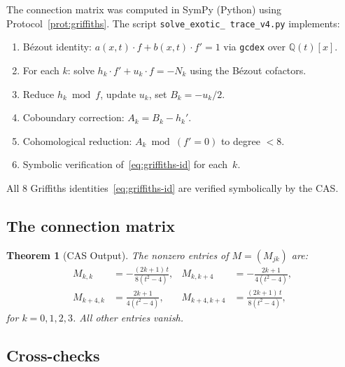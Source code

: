 \documentclass[11pt]{article}
\theoremstyle{plain}
\newtheorem{theorem}{Theorem}[section]
\theoremstyle{definition}
\theoremstyle{remark}
\newcommand{\Q}{\mathbb{Q}}
\begin{document}
The connection matrix was computed in SymPy (Python) using
Protocol~\ref{prot:griffiths}. The script \texttt{solve\_exotic\_%
trace\_v4.py} implements:
\begin{enumerate}[nosep]
\item B\'ezout identity: $a(x,t) \cdot f + b(x,t) \cdot f' = 1$
  via \texttt{gcdex} over $\Q(t)[x]$.
\item For each $k$: solve $h_k \cdot f' + u_k \cdot f = -N_k$
  using the B\'ezout cofactors.
\item Reduce $h_k \bmod f$, update $u_k$, set $B_k = -u_k/2$.
\item Coboundary correction: $A_k = B_k - h_k'$.
\item Cohomological reduction: $A_k \bmod (f' = 0)$ to degree $< 8$.
\item Symbolic verification of~\eqref{eq:griffiths-id} for each~$k$.
\end{enumerate}

All 8 Griffiths identities~\eqref{eq:griffiths-id} are verified
symbolically by the CAS.

\subsection{The connection matrix}

\begin{theorem}[CAS Output]\label{thm:matrix}
The nonzero entries of $M = (M_{jk})$ are:
\begin{align*}
  M_{k,k} &= -\frac{(2k+1)\, t}{8(t^2-4)}, &
  M_{k,k+4} &= -\frac{2k+1}{4(t^2-4)}, \\
  M_{k+4,k} &= \frac{2k+1}{4(t^2-4)}, &
  M_{k+4,k+4} &= \frac{(2k+1)\, t}{8(t^2-4)},
\end{align*}
for $k = 0, 1, 2, 3$.
All other entries vanish.
\end{theorem}

\subsection{Cross-checks}
\end{document}
